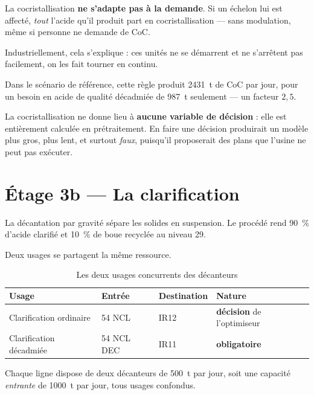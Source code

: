 \begin{alerte}[title={Le point le plus contre-intuitif du sujet}]
La cocristallisation \textbf{ne s'adapte pas à la demande}. Si un échelon lui est affecté,
\emph{tout} l'acide qu'il produit part en cocristallisation --- sans modulation, même si
personne ne demande de CoC.

Industriellement, cela s'explique : ces unités ne se démarrent et ne s'arrêtent pas
facilement, on les fait tourner en continu.
\end{alerte}

Dans le scénario de référence, cette règle produit \SI{2431}{\tonne} de CoC par jour, pour un
besoin en acide de qualité décadmiée de \SI{987}{\tonne} seulement --- un facteur $2{,}5$.

\begin{encadre}[title={Conséquence pour le modèle}]
La cocristallisation ne donne lieu à \textbf{aucune variable de décision} : elle est
entièrement calculée en prétraitement. En faire une décision produirait un modèle plus gros,
plus lent, et surtout \emph{faux}, puisqu'il proposerait des plans que l'usine ne peut pas
exécuter.
\end{encadre}

\section{Étage 3b --- La clarification}

La décantation par gravité sépare les solides en suspension. Le procédé rend
\SI{90}{\percent} d'acide clarifié et \SI{10}{\percent} de boue recyclée au niveau 29.

Deux usages se partagent la même ressource.

\begin{table}[H]
\centering
\caption{Les deux usages concurrents des décanteurs}
\label{tab:usages-decanteurs}
\begin{tabular}{@{}llll@{}}
\toprule
\textbf{Usage} & \textbf{Entrée} & \textbf{Destination} & \textbf{Nature} \\
\midrule
Clarification ordinaire & 54 NCL & IR12 & \textbf{décision} de l'optimiseur \\
Clarification décadmiée & 54 NCL DEC & IR11 & \textbf{obligatoire} \\
\bottomrule
\end{tabular}
\end{table}

Chaque ligne dispose de deux décanteurs de \SI{500}{\tonne} par jour, soit une capacité
\emph{entrante} de \SI{1000}{\tonne} par jour, tous usages confondus.

